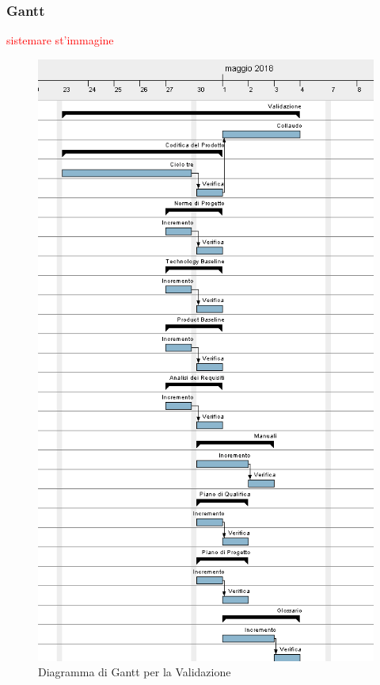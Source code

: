 \subsubsection{Gantt}
\textcolor{red}{sistemare st'immagine}
\begin{figure}[H]
	\centering 
	\includegraphics[width=1\textwidth]{images/Validazione.png}
	\caption{Diagramma di Gantt per la Validazione}
	\label{graficobello6} 
\end{figure}
